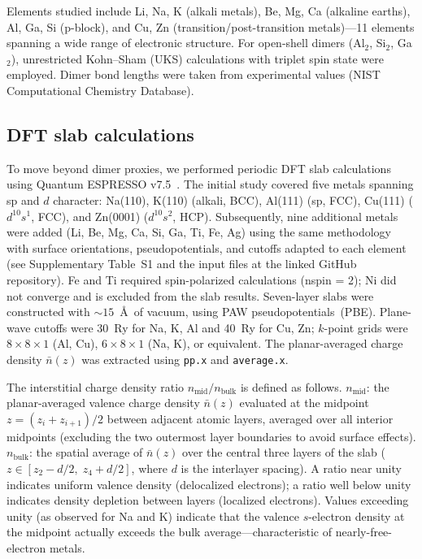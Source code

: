 \documentclass[twocolumn,showpacs,preprintnumbers,amsmath,amssymb,prb]{revtex4-2}
\begin{document}
Elements studied include Li, Na, K (alkali metals),
Be, Mg, Ca (alkaline earths), Al, Ga, Si (p-block),
and Cu, Zn (transition/post-transition metals)---11 elements
spanning a wide range of electronic structure.
For open-shell dimers (Al$_2$, Si$_2$, Ga$_2$),
unrestricted Kohn--Sham (UKS) calculations with
triplet spin state were employed.
Dimer bond lengths were taken from experimental values
(NIST Computational Chemistry Database).

\subsection{DFT slab calculations}
\label{sec:slab}

To move beyond dimer proxies, we performed periodic DFT slab
calculations using Quantum ESPRESSO
v7.5~\cite{Giannozzi2009,Giannozzi2017}.
The initial study covered five metals spanning sp and $d$ character:
Na(110), K(110) (alkali, BCC), Al(111) (sp, FCC),
Cu(111) ($d^{10}s^1$, FCC), and Zn(0001) ($d^{10}s^2$, HCP).
Subsequently, nine additional metals were added
(Li, Be, Mg, Ca, Si, Ga, Ti, Fe, Ag) using the same methodology
with surface orientations, pseudopotentials, and cutoffs adapted
to each element (see Supplementary Table~S1 and the input files
at the linked GitHub repository).
Fe and Ti required spin-polarized calculations (nspin = 2);
Ni did not converge and is excluded from the slab results.
Seven-layer slabs were constructed with $\sim\!15$~\AA\ of vacuum,
using PAW pseudopotentials~(PBE).
Plane-wave cutoffs were 30~Ry for Na, K, Al and 40~Ry for Cu, Zn;
$k$-point grids were $8 \times 8 \times 1$ (Al, Cu),
$6 \times 8 \times 1$ (Na, K), or equivalent.
The planar-averaged charge density $\bar{n}(z)$ was
extracted using \texttt{pp.x} and \texttt{average.x}.

The interstitial charge density ratio
$n_\mathrm{mid}/n_\mathrm{bulk}$ is defined as follows.
$n_\mathrm{mid}$: the planar-averaged valence charge density
$\bar{n}(z)$ evaluated at the midpoint $z = (z_i + z_{i+1})/2$
between adjacent atomic layers, averaged over all interior
midpoints (excluding the two outermost layer boundaries to
avoid surface effects).
$n_\mathrm{bulk}$: the spatial average of $\bar{n}(z)$ over
the central three layers of the slab
($z \in [z_2 - d/2,\; z_4 + d/2]$, where $d$ is the
interlayer spacing).
A ratio near unity indicates uniform valence density
(delocalized electrons); a ratio well below unity indicates
density depletion between layers (localized electrons).
Values exceeding unity (as observed for Na and K) indicate
that the valence $s$-electron density at the midpoint actually
exceeds the bulk average---characteristic of nearly-free-electron
metals.
\end{document}
